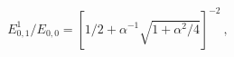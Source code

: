 \begin{equation}
E_{0,1}^1/E_{0,0}=\left[1/2+\alpha^{-1}\sqrt{1+\alpha^2/4} \right]^{-2} \ ,
\end{equation}

